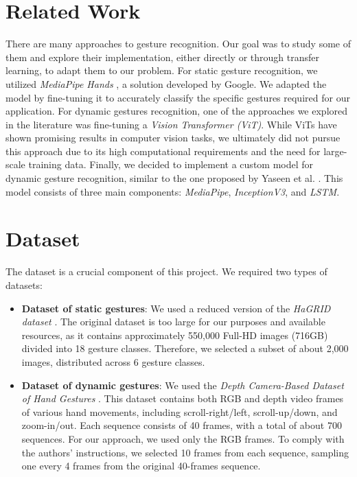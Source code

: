 \documentclass[10pt,twocolumn,letterpaper]{article}
\begin{document}
\section{Related Work}
There are many approaches to gesture recognition. Our goal was to study some of them and explore their implementation, either directly or through transfer learning, to adapt them to our problem.  
For static gesture recognition, we utilized \textit{MediaPipe Hands} \cite{zhang2020mediapipehandsondevicerealtime}, a solution developed by Google. We adapted the model by fine-tuning it to accurately classify the specific gestures required for our application.  
For dynamic gestures recognition, one of the approaches we explored in the literature was fine-tuning a \textit{Vision Transformer (ViT)}. While ViTs have shown promising results in computer vision tasks, we ultimately did not pursue this approach due to its high computational requirements and the need for large-scale training data.  
Finally, we decided to implement a custom model for dynamic gesture recognition, similar to the one proposed by Yaseen et al. \cite{electronics13163233}. This model consists of three main components: \textit{MediaPipe}, \textit{InceptionV3}, and \textit{LSTM}.  

\section{Dataset}  
The dataset is a crucial component of this project. We required two types of datasets:  

\begin{itemize}  
   \item \textbf{Dataset of static gestures}: We used a reduced version of the \textit{HaGRID dataset} \cite{Alexander_2024}.  
   The original dataset is too large for our purposes and available resources, as it contains approximately 550,000 Full-HD images (716GB) divided into 18 gesture classes.  
   Therefore, we selected a subset of about 2,000 images, distributed across 6 gesture classes.  

   \item \textbf{Dataset of dynamic gestures}: We used the \textit{Depth Camera-Based Dataset of Hand Gestures} \cite{JEERU2022108659}.  
   This dataset contains both RGB and depth video frames of various hand movements, including scroll-right/left, scroll-up/down, and zoom-in/out. Each sequence consists of 40 frames, with a total of about 700 sequences.  
   For our approach, we used only the RGB frames. To comply with the authors’ instructions, we selected 10 frames from each sequence, sampling one every 4 frames from the original 40-frames sequence.  
\end{itemize}  
\end{document}
